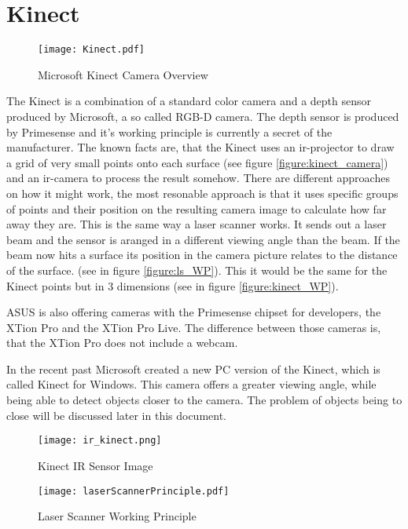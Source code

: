 \section{Kinect}
\begin{figure}[htp]
	\centering
	\texttt{[image: Kinect.pdf]}
	\caption{Microsoft Kinect Camera Overview}
	\label{figure:kinect_camera}
\end{figure}

The Kinect is a combination of a standard color camera and a depth sensor produced by Microsoft, a so called RGB-D camera. 
The depth sensor is produced by Primesense and it's working principle is currently a secret of the manufacturer. 
The known facts are, that the Kinect uses an ir-projector to draw a grid of very small points onto each surface 
(see figure \vref{figure:kinect_camera}) and an ir-camera to process the result somehow.  
There are different approaches on how it might work, the most resonable approach is that it uses 
specific groups of points and their position on the resulting camera image to calculate how far 
away they are. This is the same way a laser scanner works. 
It sends out a laser beam and the sensor is aranged in a different viewing angle than the beam.
If the beam now hits a surface its position in the camera picture relates to the distance of the surface.
(see in figure \vref{figure:ls_WP}). This it would be the same for the Kinect points but in 3 dimensions 
(see in figure \vref{figure:kinect_WP}).

ASUS is also offering cameras with the Primesense chipset for developers, the XTion Pro and the XTion Pro Live.
The difference between those cameras is, that the XTion Pro does not include a webcam.

In the recent past Microsoft created a new PC version of the Kinect, which is called Kinect for Windows.
This camera offers a greater viewing angle, while being able to detect objects closer to the camera.
The problem of objects being to close will be discussed later in this document.

\begin{figure}[htp]
	\centering
	\texttt{[image: ir\_kinect.png]}
	\caption{Kinect IR Sensor Image}
	\label{figure:kinect_ir}
\end{figure}

\begin{figure}[htp]
	\centering
	\texttt{[image: laserScannerPrinciple.pdf]}
	\caption{Laser Scanner Working Principle}
	\label{figure:ls_WP}
\end{figure}


